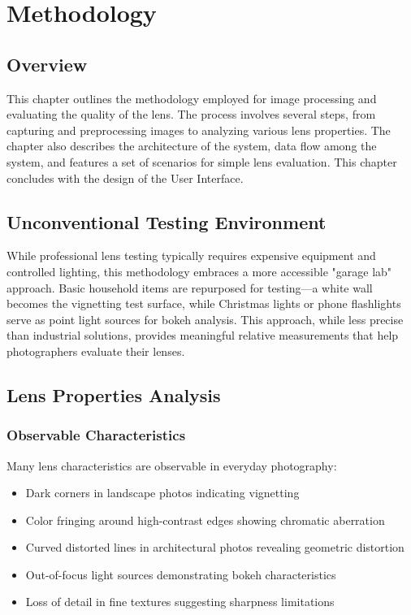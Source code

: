 \chapter{Methodology}

\section{Overview}
This chapter outlines the methodology employed for image processing and evaluating the quality of the lens. The process involves several steps, from capturing and preprocessing images to analyzing various lens properties. The chapter also describes the architecture of the system, data flow among the system, and features a set of scenarios for simple lens evaluation. This chapter concludes with the design of the User Interface.

\section{Unconventional Testing Environment}
While professional lens testing typically requires expensive equipment and controlled lighting, this methodology embraces a more accessible "garage lab" approach. Basic household items are repurposed for testing---a white wall becomes the vignetting test surface, while Christmas lights or phone flashlights serve as point light sources for bokeh analysis. This approach, while less precise than industrial solutions, provides meaningful relative measurements that help photographers evaluate their lenses.

\section{Lens Properties Analysis}

\subsection{Observable Characteristics}
Many lens characteristics are observable in everyday photography:
\begin{itemize}
    \item Dark corners in landscape photos indicating vignetting
    \item Color fringing around high-contrast edges showing chromatic aberration
    \item Curved distorted lines in architectural photos revealing geometric distortion
    \item Out-of-focus light sources demonstrating bokeh characteristics
    \item Loss of detail in fine textures suggesting sharpness limitations
\end{itemize}


